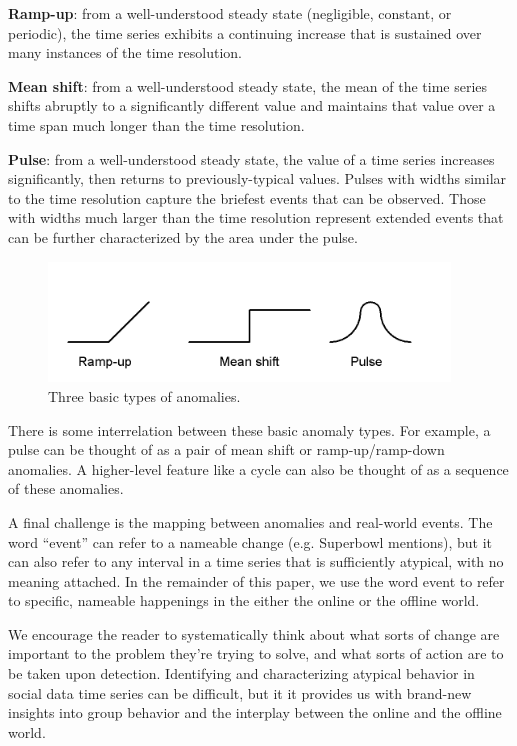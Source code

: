 \documentclass{article}
\begin{document}
\textbf{Ramp-up}: from a well-understood steady state (negligible, constant, or
periodic), the time series exhibits a continuing increase that is sustained
over many instances of the time resolution. 

\textbf{Mean shift}: from a well-understood steady state, the mean of the time
series shifts abruptly to a significantly different value and maintains that
value over a time span much longer than the time resolution. 

\textbf{Pulse}: from a well-understood steady state, the value of a time series
increases significantly, then returns to previously-typical values.
Pulses with widths similar to the time resolution capture the briefest
events that can be observed. Those with widths much larger than 
the time resolution represent extended events that can be further
characterized by the area under the pulse.

\begin{figure}[ht]
\begin{center}
\includegraphics[width=0.95\textwidth]{fig/anomalies.png}
\caption{Three basic types of anomalies.}
\label{fig:anomalies}
\end{center}
\end{figure}

There is some interrelation between these basic anomaly types. For example, a
pulse can be thought of as a pair of mean shift or ramp-up/ramp-down anomalies.
A higher-level feature like a cycle can also be thought of as a sequence of
these anomalies. 
    
A final challenge is the mapping between anomalies and real-world events. The
word ``event'' can refer to a nameable change (e.g. Superbowl mentions), but it can
also refer to any interval in a time series that is sufficiently atypical, with
no meaning attached. In the remainder of this paper, we use the word event to
refer to specific, nameable happenings in the either the online or the offline world. 

We encourage the reader to systematically think about what sorts of change
are important to the problem they're trying to solve, and what sorts of
action are to be taken upon detection. Identifying and characterizing
atypical behavior in social data time series can be difficult, but it it
provides us with brand-new insights into group behavior and the interplay
between the online and the offline world.  
\end{document}

